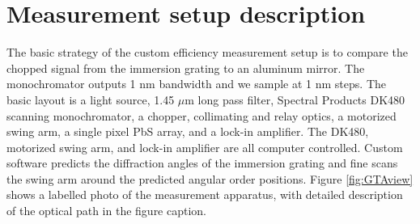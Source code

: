 \section{Measurement setup description} \label{sec:GTA}
The basic strategy of the custom efficiency measurement setup is to compare the chopped signal from the immersion grating to an aluminum mirror.  The monochromator outputs 1 nm bandwidth and we sample at 1 nm steps.  The basic layout is a light source, 1.45 $\mu$m long pass filter, Spectral Products DK480 scanning monochromator, a chopper, collimating and relay optics, a motorized swing arm, a single pixel PbS array, and a lock-in amplifier.  The DK480, motorized swing arm, and lock-in amplifier are all computer controlled.  Custom software predicts the diffraction angles of the immersion grating and fine scans the swing arm around the predicted angular order positions.  Figure \ref{fig:GTAview} shows a labelled photo of the measurement apparatus, with detailed description of the optical path in the figure caption.  

